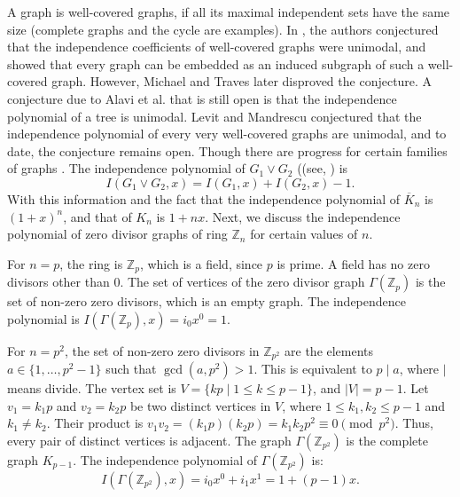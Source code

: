 \documentclass[12pt,twoside]{article}
\begin{document}
A graph is well-covered graphs, if all its maximal independent sets have the same size (complete graphs and the cycle are examples).
In \cite{brown}, the authors conjectured that the independence coefficients of well-covered graphs were unimodal, and showed that every graph 
can be embedded as an induced subgraph of such a well-covered graph. However, Michael and Traves \cite{micheal} later disproved the conjecture. A conjecture due to Alavi et al. \cite{alavi} that is still open is that the independence polynomial of a tree is unimodal. Levit and Mandrescu \cite{levitejc} conjectured that the independence polynomial of every very well-covered graphs are unimodal, and to date, the conjecture remains open. Though there are progress for certain families of graphs \cite{micheal,browncameron}. 
The independence polynomial of $ G_{1}\vee G_{2} $ ((see, \cite{gutman}) is 
\begin{equation}\label{eq join}
	I(G_{1}\vee G_{2},x)=I(G_{1},x)+I(G_{2},x)-1.
\end{equation} With this information and the fact that the independence polynomial of $\overline{K}_{n}$ is $(1+x)^{n}$, and that of $K_{n}$ is $1+nx$. Next, we discuss the independence polynomial of zero divisor graphs of ring $\mathbb{Z}_{n}$ for certain values of $n.$
\vskip 2mm







For  $n=p$, the ring is $\mathbb{Z}_p$, which is a field, since $p$ is prime. A field has no zero divisors other than 0. The set of vertices of the zero divisor graph $\varGamma(\mathbb{Z}_p)$ is the set of non-zero zero divisors, which is an empty graph. 
The independence polynomial is $I(\varGamma(\mathbb{Z}_p), x) = i_0 x^0 = 1$.

For  $n=p^2$, the set of non-zero zero divisors in $\mathbb{Z}_{p^2}$ are the elements $a \in \{1, \dots, p^2-1\}$ such that $\gcd(a, p^2) > 1$. This is equivalent to $p\mid a$, where $\mid$ means divide. The vertex set is $V = \{kp \mid 1 \le k \le p-1\}$, and  $|V|=p-1$. Let $v_1 = k_1 p$ and $v_2 = k_2 p$ be two distinct vertices in $V$, where $1 \le k_1, k_2 \le p-1$ and $k_1 \neq k_2$. Their product is $v_1 v_2 = (k_1 p)(k_2 p) = k_1 k_2 p^2 \equiv 0 \pmod{p^2}$.
Thus, every pair of distinct vertices is adjacent. The graph $\varGamma(\mathbb{Z}_{p^2})$ is the complete graph $K_{p-1}$.
The independence polynomial of $\varGamma(\mathbb{Z}_{p^2}) $ is:
$$I(\varGamma(\mathbb{Z}_{p^2}), x) = i_0 x^0 + i_1 x^1 = 1 + (p-1)x.$$
\end{document}
